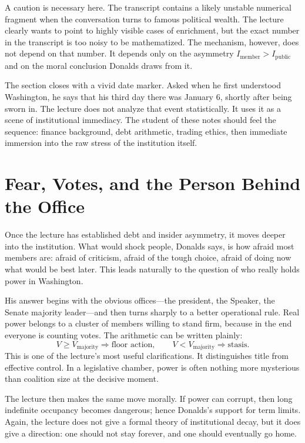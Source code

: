 A caution is necessary here. The transcript contains a likely unstable numerical fragment when the conversation turns to famous political wealth. The lecture clearly wants to point to highly visible cases of enrichment, but the exact number in the transcript is too noisy to be mathematized. The mechanism, however, does not depend on that number. It depends only on the asymmetry $I_{\text{member}} > I_{\text{public}}$ and on the moral conclusion Donalds draws from it.

The section closes with a vivid date marker. Asked when he first understood Washington, he says that his third day there was January 6, shortly after being sworn in. The lecture does not analyze that event statistically. It uses it as a scene of institutional immediacy. The student of these notes should feel the sequence: finance background, debt arithmetic, trading ethics, then immediate immersion into the raw stress of the institution itself.

\section{Fear, Votes, and the Person Behind the Office}

Once the lecture has established debt and insider asymmetry, it moves deeper into the institution. What would shock people, Donalds says, is how afraid most members are: afraid of criticism, afraid of the tough choice, afraid of doing now what would be best later. This leads naturally to the question of who really holds power in Washington.

His answer begins with the obvious offices---the president, the Speaker, the Senate majority leader---and then turns sharply to a better operational rule. Real power belongs to a cluster of members willing to stand firm, because in the end everyone is counting votes. The arithmetic can be written plainly:
\begin{equation}
V\ge V_{\text{majority}} \Rightarrow \text{floor action},\qquad
V<V_{\text{majority}} \Rightarrow \text{stasis}.
\end{equation}
This is one of the lecture's most useful clarifications. It distinguishes title from effective control. In a legislative chamber, power is often nothing more mysterious than coalition size at the decisive moment.

The lecture then makes the same move morally. If power can corrupt, then long indefinite occupancy becomes dangerous; hence Donalds's support for term limits. Again, the lecture does not give a formal theory of institutional decay, but it does give a direction: one should not stay forever, and one should eventually go home.

